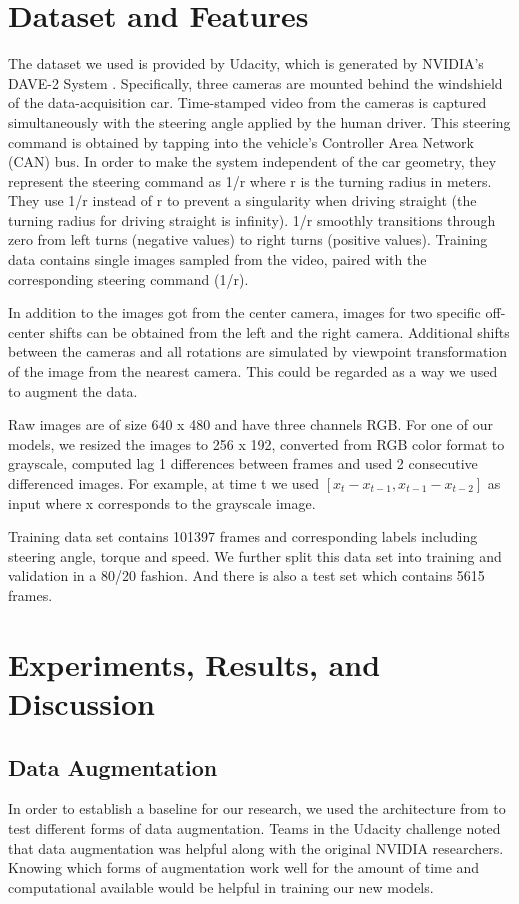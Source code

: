 \documentclass[10pt,twocolumn,letterpaper]{article}
\begin{document}
\section{Dataset and Features}
The dataset we used is provided by Udacity, which is generated by NVIDIA’s DAVE-2 System \cite{bojarski2016end}. Specifically, three cameras are mounted behind the windshield of the data-acquisition car. Time-stamped video from the cameras is captured simultaneously with the steering angle applied by the human driver. This steering command is obtained by tapping into the vehicle’s Controller Area Network (CAN) bus. In order to make the system independent of the car geometry, they represent the steering command as 1/r where r is the turning radius in meters. They use 1/r instead of r to prevent a singularity when driving straight (the turning radius for driving straight is infinity). 1/r smoothly transitions through zero from left turns (negative values) to right turns (positive values). Training data contains single images sampled from the video, paired with the corresponding steering command (1/r).

In addition to the images got from the center camera, images for two specific off-center shifts can be obtained from the left and the right camera. Additional shifts between the cameras and all rotations are simulated by viewpoint transformation of the image from the nearest camera. This could be regarded as a way we used to augment the data.

Raw images are of size 640 x 480 and have three channels RGB. For one of our models, we resized the images to 256 x 192, converted from RGB color format to grayscale, computed lag 1 differences between frames and used 2 consecutive differenced images. For example, at time t we used $[x_{t} - x_{t-1}, x_{t-1} - x_{t-2}]$ as input where x corresponds to the grayscale image.

Training data set contains 101397 frames and corresponding labels including steering angle, torque and speed. We further split this data set into training and validation in a 80/20 fashion. And there is also a test set which contains 5615 frames. 

\section{Experiments, Results, and Discussion}

\subsection{Data Augmentation}
In order to establish a baseline for our research, we used the architecture from \cite{bojarski2016end} to test different forms of data augmentation. Teams in the Udacity challenge noted that data augmentation was helpful along with the original NVIDIA researchers. Knowing which forms of augmentation work well for the amount of time and computational available would be helpful in training our new models.
\end{document}
